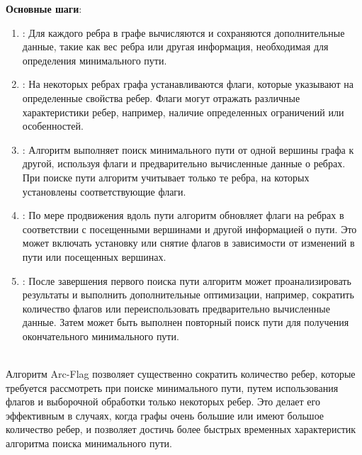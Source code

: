         \textbf{Основные шаги}:
        \begin{enumerate}
            \item {}: Для каждого ребра в графе вычисляются и сохраняются дополнительные данные, такие как вес ребра или другая информация, необходимая для определения минимального пути.
            \item {}: На некоторых ребрах графа устанавливаются флаги, которые указывают на определенные свойства ребер. Флаги могут отражать различные характеристики ребер, например, наличие определенных ограничений или особенностей.
            \item {}: Алгоритм выполняет поиск минимального пути от одной вершины графа к другой, используя флаги и предварительно вычисленные данные о ребрах. При поиске пути алгоритм учитывает только те ребра, на которых установлены соответствующие флаги.
            \item {}: По мере продвижения вдоль пути алгоритм обновляет флаги на ребрах в соответствии с посещенными вершинами и другой информацией о пути. Это может включать установку или снятие флагов в зависимости от изменений в пути или посещенных вершинах.
            \item {}: После завершения первого поиска пути алгоритм может проанализировать результаты и выполнить дополнительные оптимизации, например, сократить количество флагов или переиспользовать предварительно вычисленные данные. Затем может быть выполнен повторный поиск пути для получения окончательного минимального пути.
        \end{enumerate}\\

        Алгоритм Arc-Flag позволяет существенно сократить количество ребер, которые требуется рассмотреть при поиске минимального пути, путем использования флагов и выборочной обработки только некоторых ребер. Это делает его эффективным в случаях, когда графы очень большие или имеют большое количество ребер, и позволяет достичь более быстрых временных характеристик алгоритма поиска минимального пути.
    

\newpage
